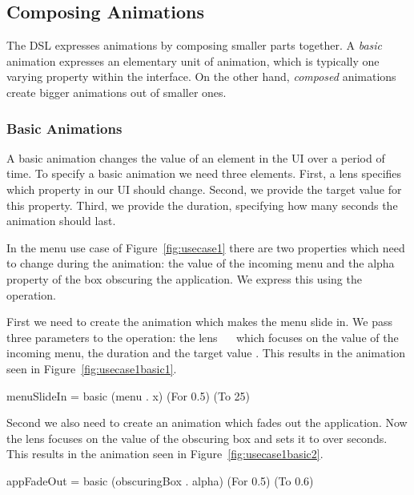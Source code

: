\subsection{Composing Animations}

The DSL expresses animations by composing smaller parts together. A \emph{basic} animation expresses an elementary unit of animation, which is typically one varying property within the interface. On the other hand, \emph{composed} animations create bigger animations out of smaller ones.

\subsubsection{Basic Animations}

A basic animation changes the value of an element in the UI over a period of time. To specify a basic animation we need three elements. First, a lens specifies which property in our UI should change. Second, we provide the target value for this property. Third, we provide the duration, specifying how many seconds the animation should last.

In the menu use case of Figure~\ref{fig:usecase1} there are two properties which need to change during the animation: the  value of the incoming menu and the alpha property of the box obscuring the application. We express this using the  operation.

First we need to create the animation which makes the menu slide in. We pass three parameters to the  operation: the lens ~~ which focuses on the  value of the incoming menu, the duration  and the target value . This results in the animation seen in Figure~\ref{fig:usecase1basic1}.

\begin{spec}
menuSlideIn = basic (menu . x) (For 0.5) (To 25)
\end{spec}

Second we also need to create an animation which fades out the application. Now the lens focuses on the  value of the obscuring box and sets it to  over  seconds. This results in the animation seen in Figure~\ref{fig:usecase1basic2}.

\begin{spec}
appFadeOut = basic (obscuringBox . alpha) (For 0.5) (To 0.6)
\end{spec}

